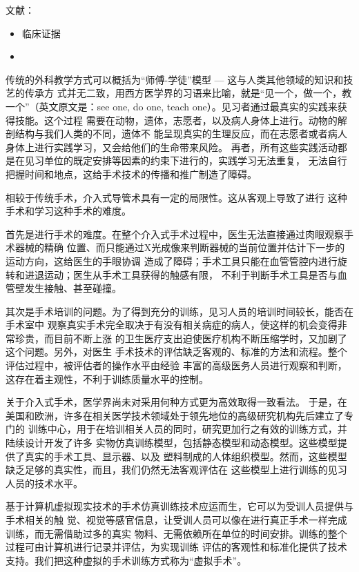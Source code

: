 文献：
\begin{itemize}
  \item 临床证据\cite{Aggarwal2006}
  \item
\end{itemize}

传统的外科教学方式可以概括为“师傅-学徒”模型 --- 这与人类其他领域的知识和技艺的传承方
式并无二致，用西方医学界的习语来比喻，就是“见一个，做一个，教一个”（英文原文是：see
one, do one, teach one）\cite{Dawson1998}。见习者通过最真实的实践来获得技能。这个过程
需要在动物，遗体，志愿者，以及病人身体上进行。动物的解剖结构与我们人类的不同，遗体不
能呈现真实的生理反应，而在志愿者或者病人身体上进行实践学习，又会给他们的生命带来风险\cite{liu2003}。
再者，所有这些实践活动都是在见习单位的既定安排等因素的约束下进行的，实践学习无法重复，
无法自行把握时间和地点，这给手术技术的传播和推广制造了障碍。

相较于传统手术，介入式导管术具有一定的局限性\cite{basdogan2007}。这从客观上导致了进行
这种手术和学习这种手术的难度。

首先是进行手术的难度。在整个介入式手术过程中，医生无法直接通过肉眼观察手术器械的精确
位置、而只能通过X光成像来判断器械的当前位置并估计下一步的运动方向，这给医生的手眼协调
造成了障碍；手术工具只能在血管管腔内进行旋转和进退运动；医生从手术工具获得的触感有限，
不利于判断手术工具是否与血管壁发生接触、甚至碰撞。

其次是手术培训的问题。为了得到充分的训练，见习人员的培训时间较长，能否在手术室中
观察真实手术完全取决于有没有相关病症的病人，使这样的机会变得非常珍贵，而目前不断上涨
的卫生医疗支出迫使医疗机构不断压缩学时，又加剧了这个问题\cite{liu2003}。另外，对医生
手术技术的评估缺乏客观的、标准的方法和流程。整个评估过程中，被评估者的操作水平由经验
丰富的高级医务人员进行观察和判断，这存在着主观性，不利于训练质量水平的控制\cite{basdogan2007}。

关于介入式手术，医学界尚未对采用何种方式更为高效取得一致看法\cite{basdogan2007}。
于是，在美国和欧洲，许多在相关医学技术领域处于领先地位的高级研究机构先后建立了专门的
训练中心，用于在培训相关人员的同时，研究更加行之有效的训练方式，并陆续设计开发了许多
实物仿真训练模型，包括静态模型和动态模型\cite{Cooper2004Review}。这些模型提供了真实的手术工具、显示器、以及
塑料制成的人体组织模型。然而，这些模型缺乏足够的真实性，而且，我们仍然无法客观评估在
这些模型上进行训练的见习人员的技术水平。

基于计算机虚拟现实技术的手术仿真训练技术应运而生，它可以为受训人员提供与手术相关的触
觉、视觉等感官信息，让受训人员可以像在进行真正手术一样完成训练，而无需借助过多的真实
物料、无需依赖所在单位的时间安排。训练的整个过程可由计算机进行记录并评估，为实现训练
评估的客观性和标准化提供了技术支持。我们把这种虚拟的手术训练方式称为“虚拟手术”。

